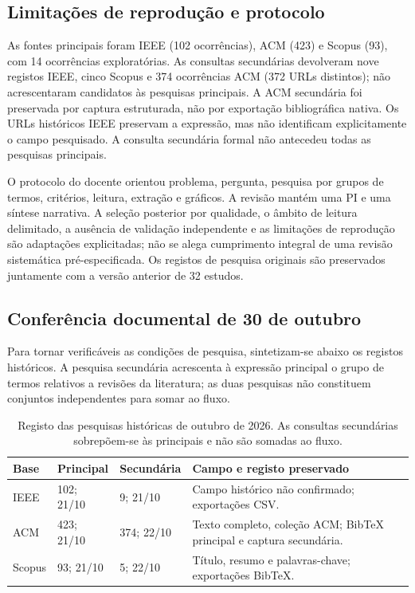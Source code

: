 \documentclass[11pt,a4paper]{article}
\begin{document}
\subsection{Limitações de reprodução e protocolo}
As fontes principais foram IEEE (102 ocorrências), ACM (423) e Scopus (93), com 14 ocorrências exploratórias. As consultas secundárias devolveram nove registos IEEE, cinco Scopus e 374 ocorrências ACM (372 URLs distintos); não acrescentaram candidatos às pesquisas principais. A ACM secundária foi preservada por captura estruturada, não por exportação bibliográfica nativa. Os URLs históricos IEEE preservam a expressão, mas não identificam explicitamente o campo pesquisado. A consulta secundária formal não antecedeu todas as pesquisas principais.

O protocolo do docente orientou problema, pergunta, pesquisa por grupos de termos, critérios, leitura, extração e gráficos. A revisão mantém uma PI e uma síntese narrativa. A seleção posterior por qualidade, o âmbito de leitura delimitado, a ausência de validação independente e as limitações de reprodução são adaptações explicitadas; não se alega cumprimento integral de uma revisão sistemática pré-especificada. Os registos de pesquisa originais são preservados juntamente com a versão anterior de 32 estudos.
\clearpage
\subsection*{Conferência documental de 30 de outubro}
Para tornar verificáveis as condições de pesquisa, sintetizam-se abaixo os registos históricos. A pesquisa secundária acrescenta à expressão principal o grupo de termos relativos a revisões da literatura; as duas pesquisas não constituem conjuntos independentes para somar ao fluxo.
\begin{table}[H]\centering\small
\begin{tabularx}{\linewidth}{@{}P{2cm}P{2.5cm}P{2.8cm}Y@{}}\toprule
Base & Principal & Secundária & Campo e registo preservado\\\midrule
IEEE & 102; 21/10 & 9; 21/10 & Campo histórico não confirmado; exportações CSV.\\
ACM & 423; 21/10 & 374; 22/10 & Texto completo, coleção ACM; BibTeX principal e captura secundária.\\
Scopus & 93; 21/10 & 5; 22/10 & Título, resumo e palavras-chave; exportações BibTeX.\\\bottomrule
\end{tabularx}
\caption[Registo das pesquisas históricas por base]{Registo das pesquisas históricas de outubro de 2026. As consultas secundárias sobrepõem-se às principais e não são somadas ao fluxo.}
\end{table}
\end{document}

